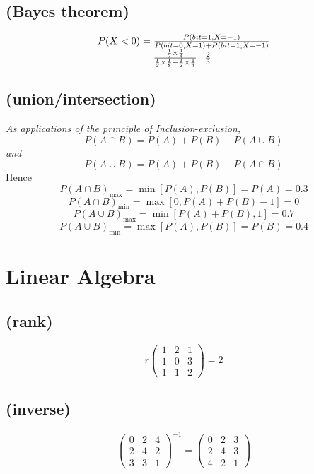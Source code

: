 \documentclass[8pt,a4paper]{exam}
\begin{document}
	  \subsection{(Bayes theorem)}
\[\begin{array}{l}
P(X < 0) = \frac{{P(bit = 1,X =  - 1)}}{{P(bit = 0,X = 1) + P(bit = 1,X =  - 1)}}\\
{\kern 1pt} {\kern 1pt} {\kern 1pt} {\kern 1pt} {\kern 1pt} {\kern 1pt} {\kern 1pt} {\kern 1pt} {\kern 1pt} {\kern 1pt} {\kern 1pt} {\kern 1pt} {\kern 1pt} {\kern 1pt} {\kern 1pt} {\kern 1pt} {\kern 1pt} {\kern 1pt} {\kern 1pt} {\kern 1pt} {\kern 1pt} {\kern 1pt} {\kern 1pt} {\kern 1pt} {\kern 1pt} {\kern 1pt} {\kern 1pt} {\kern 1pt} {\kern 1pt} {\kern 1pt} {\kern 1pt} {\kern 1pt} {\kern 1pt}  {\kern 1pt} {\kern 1pt} {\kern 1pt} {\kern 1pt} {\kern 1pt} {\kern 1pt} {\kern 1pt} {\kern 1pt} {\kern 1pt} {\kern 1pt}  = \frac{{\frac{1}{2} \times \frac{1}{4}}}{{\frac{1}{2} \times \frac{1}{8}{\rm{ + }}\frac{1}{2} \times \frac{1}{4}}}{\rm{ = }}\frac{2}{3}
\end{array}\]
	  \subsection{(union/intersection)}
	  \textit{As applications of the principle of Inclusion}-\textit{exclusion,}
	  \[P(A \cap B) = P(A) + P(B) - P(A \cup B)\]
	  \textit{and}
	  \[P(A \cup B) = P(A) + P(B) - P(A \cap B)\]
	  Hence
      \[P{(A \cap B)_{\max }} = \min [P(A),P(B)] = P(A) = 0.3\]
     \[P{(A \cap B)_{\min }} = \max [0,P(A) + P(B) - 1] = 0\]
	 \[P{(A \cup B)_{\max }} = \min [P(A) + P(B),1] = 0.7\]
	 \[P{(A \cup B)_{\min }} = \max [P(A),P(B)] = P(B) = 0.4\]
 \section{Linear Algebra}
 \subsection{(rank)}
 \[r\left( {\begin{array}{*{20}{c}}
 	1&2&1\\
 	1&0&3\\
 	1&1&2
 	\end{array}} \right) = 2\]
 \subsection{(inverse)}
 \[{\left( {\begin{array}{cccccccccccccccccccc}
 		0&2&4\\
 		2&4&2\\
 		3&3&1
 		\end{array}} \right)^{ - 1}} = \left( {\begin{array}{*{20}{c}}
 		0&2&3\\
 		2&4&3\\
 		4&2&1
 		\end{array}} \right)\]
\end{document}
